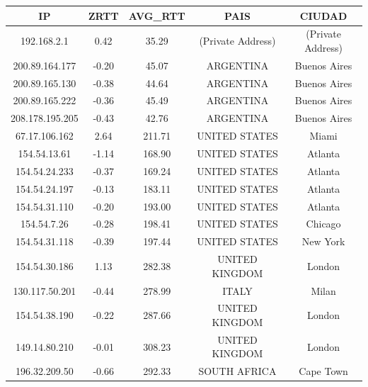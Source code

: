 \begin{tabular}{|c@{\hspace{5ex}}c@{\hspace{5ex}}c@{\hspace{5ex}}c@{\hspace{5ex}}c|}
 \hline
 \rule{0pt}{1.2em}IP & ZRTT & AVG\_RTT & PAIS & CIUDAD\\[0.2em]
 \hline

\rule{0pt}{1.2em} 192.168.2.1  &  0.42 & 35.29 & (Private Address) & (Private Address) \\[0.2em]
\rule{0pt}{1.2em} 200.89.164.177  &  -0.20 & 45.07 & ARGENTINA & Buenos Aires \\[0.2em]
\rule{0pt}{1.2em} 200.89.165.130  &  -0.38 & 44.64 & ARGENTINA & Buenos Aires \\[0.2em]
\rule{0pt}{1.2em} 200.89.165.222  &  -0.36 & 45.49 & ARGENTINA & Buenos Aires \\[0.2em]
\rule{0pt}{1.2em} 208.178.195.205  &  -0.43 & 42.76 & ARGENTINA & Buenos Aires\\[0.2em]
\rule{0pt}{1.2em} 67.17.106.162  &  2.64 & 211.71 & UNITED STATES & Miami \\[0.2em]
\rule{0pt}{1.2em} 154.54.13.61  &  -1.14 & 168.90 & UNITED STATES & Atlanta \\[0.2em]
\rule{0pt}{1.2em} 154.54.24.233  &  -0.37 & 169.24 & UNITED STATES & Atlanta \\[0.2em]
\rule{0pt}{1.2em} 154.54.24.197  &  -0.13 & 183.11 & UNITED STATES & Atlanta \\[0.2em]
\rule{0pt}{1.2em} 154.54.31.110  &  -0.20 & 193.00 & UNITED STATES & Atlanta \\[0.2em]
\rule{0pt}{1.2em} 154.54.7.26  &  -0.28 & 198.41 & UNITED STATES & Chicago \\[0.2em]
\rule{0pt}{1.2em} 154.54.31.118  &  -0.39 & 197.44 & UNITED STATES & New York \\[0.2em]
\rule{0pt}{1.2em} 154.54.30.186  &  1.13 & 282.38 & UNITED KINGDOM & London \\[0.2em]
\rule{0pt}{1.2em} 130.117.50.201  &  -0.44 & 278.99 & ITALY & Milan \\[0.2em]
\rule{0pt}{1.2em} 154.54.38.190  &  -0.22 & 287.66 & UNITED KINGDOM & London \\[0.2em]
\rule{0pt}{1.2em} 149.14.80.210  &  -0.01 & 308.23  & UNITED KINGDOM & London \\[0.2em]
\rule{0pt}{1.2em} 196.32.209.50  &  -0.66 & 292.33 & SOUTH AFRICA & Cape Town \\[0.2em]

\end{tabular}
